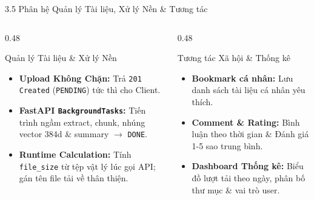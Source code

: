\documentclass[10pt, aspectratio=169]{beamer}
\begin{document}
\begin{frame}{3.5 Phân hệ Quản lý Tài liệu, Xử lý Nền \& Tương tác}
    \begin{columns}[T]
        \begin{column}{0.48\textwidth}
            \begin{block}{Quản lý Tài liệu \& Xử lý Nền}
                \begin{itemize}
                    \item \textbf{Upload Không Chặn:} Trả \texttt{201 Created} (\texttt{PENDING}) tức thì cho Client.
                    \item \textbf{FastAPI \texttt{BackgroundTasks}:} Tiến trình ngầm extract, chunk, nhúng vector 384d \& summary $\rightarrow$ \texttt{DONE}.
                    \item \textbf{Runtime Calculation:} Tính \texttt{file\_size} từ tệp vật lý lúc gọi API; gán tên file tải về thân thiện.
                \end{itemize}
            \end{block}
        \end{column}

        \begin{column}{0.48\textwidth}
            \begin{exampleblock}{Tương tác Xã hội \& Thống kê}
                \begin{itemize}
                    \item \textbf{Bookmark cá nhân:} Lưu danh sách tài liệu cá nhân yêu thích.
                    \item \textbf{Comment \& Rating:} Bình luận theo thời gian \& Đánh giá 1-5 sao trung bình.
                    \item \textbf{Dashboard Thống kê:} Biểu đồ lượt tải theo ngày, phân bố thư mục \& vai trò user.
                \end{itemize}
            \end{exampleblock}
        \end{column}
    \end{columns}
\end{frame}
\end{document}
